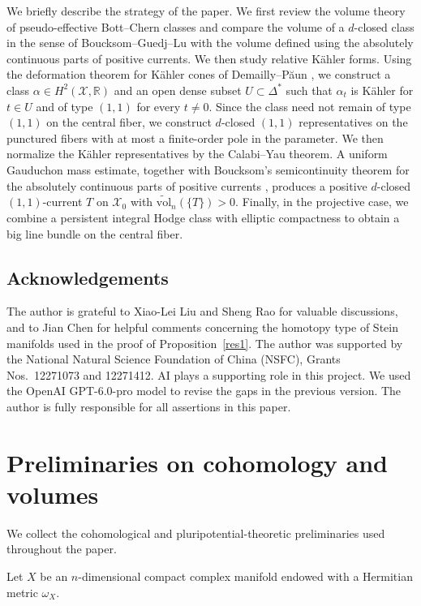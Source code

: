 \documentclass[11pt,letterpaper]{amsart}
\numberwithin{equation}{section}
\newcommand{\RR}{\mathbb{R}}
\newcommand{\cal}{\mathcal}
\def\cX{{\cal X}}
\begin{document}
We briefly describe the strategy of the paper. We first review the volume theory of pseudo-effective Bott--Chern classes and compare the volume of a $d$-closed class in the sense of Boucksom--Guedj--Lu with the volume defined using the absolutely continuous parts of positive currents. We then study relative K\"ahler forms. Using the deformation theorem for K\"ahler cones of Demailly--P\u{a}un \cite[Theorem 0.9]{DP04}, we construct a class $\alpha\in H^2(\cX,\RR)$ and an open dense subset $U\subset\Delta^*$ such that $\alpha_t$ is K\"ahler for $t\in U$ and of type $(1,1)$ for every $t\ne0$. Since the class need not remain of type $(1,1)$ on the central fiber, we construct $d$-closed $(1,1)$ representatives on the punctured fibers with at most a finite-order pole in the parameter. We then normalize the K\"ahler representatives by the Calabi--Yau theorem. A uniform Gauduchon mass estimate, together with Boucksom's semicontinuity theorem for the absolutely continuous parts of positive currents \cite[Proposition 2.1]{Bou}, produces a positive $d$-closed $(1,1)$-current $T$ on $\cX_0$ with $\widetilde{\mathrm{vol}}_n(\{T\})>0$. Finally, in the projective case, we combine a persistent integral Hodge class with elliptic compactness to obtain a big line bundle on the central fiber.

\subsection*{Acknowledgements}
The author is grateful to Xiao-Lei Liu and Sheng Rao for valuable discussions, and to Jian Chen for helpful comments concerning the homotopy type of Stein manifolds used in the proof of Proposition~\ref{res1}. The author was supported by the National Natural Science Foundation of China (NSFC), Grants Nos.~12271073 and 12271412. AI plays a supporting role in this project. We used the  OpenAI GPT-6.0-pro model to revise the gaps in the previous version.  The author is fully responsible for all assertions in this paper.

\section{Preliminaries on cohomology and volumes}


We collect the cohomological and pluripotential-theoretic preliminaries used throughout the paper.

Let $X$ be an $n$-dimensional compact complex manifold endowed with a Hermitian metric $\omega_X$.
\end{document}
